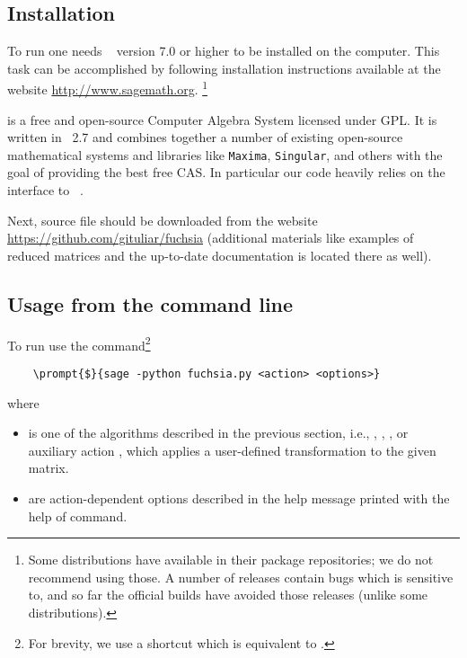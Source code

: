 \documentclass[12pt,a4paper]{article}
\begin{document}
\subsection{Installation}

To run \fuchsia one needs \sage~\cite{sagemath} version 7.0 or higher to be installed on the computer.
This task can be accomplished by following installation instructions available at the website \url{http://www.sagemath.org}.
\footnote{
    Some \linux distributions have \sage available in their package repositories; we do not recommend using those.
    A number of \maxima releases contain bugs which \fuchsia is sensitive to, and so far the official \sage builds have avoided those releases (unlike some \linux distributions).
}

\sage is a free and open-source Computer Algebra System licensed under GPL.
It is written in \python~2.7 and combines together a number of existing open-source mathematical systems and libraries like \texttt{Maxima}, \texttt{Singular}, and others with the goal of providing the best free CAS.
In particular our code heavily relies on the interface to \maxima~\cite{maxima}.

Next, source file  should be downloaded from the website \url{https://github.com/gituliar/fuchsia} (additional materials like examples of reduced matrices and the up-to-date documentation is located there as well).


\vspace{10mm}

\subsection{Usage from the command line}

To run \fuchsia use the command\footnote{For brevity, we use a shortcut  which is equivalent to .}
\begin{Verbatim}
    \prompt{$}{sage -python fuchsia.py <action> <options>}
\end{Verbatim}
where
\begin{itemize}
  \item {} is one of the algorithms described in the previous section, i.e., , , , or auxiliary action , which applies a user-defined transformation to the given matrix.
  \item {} are action-dependent options described in the help message printed with the help of  command.
\end{itemize}
\end{document}

